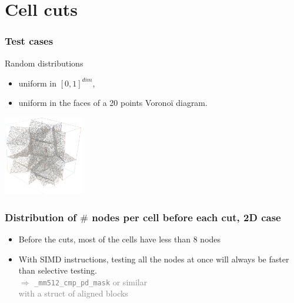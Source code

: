 \documentclass[aspectratio=169]{beamer}
\begin{document}
\section{Cell cuts}

\begin{frame}
    \frametitle{Test cases}

    Random distributions
    \begin{itemize}
        \item uniform in $[0,1]^{dim}$,
        \item uniform in the faces of a 20 points Voronoï diagram.
    \end{itemize}

    \vfill
    \begin{center}
        
        \kern 1cm
        \includegraphics[width=0.26\textwidth]{img/voro_distrib_3d.png}
    \end{center}
\end{frame}

\begin{frame}
    \frametitle{Distribution of $\#$ nodes per cell before each cut, 2D case}

    \begin{minipage}[c][0.6\textheight][c]{0.4\textwidth}
        
    \end{minipage}
    \textwidth
    \begin{minipage}{0.55\textwidth}
        \begin{itemize}
            \item Before the cuts, most of the cells have less than 8 nodes
            
            \bigskip
            \item With SIMD instructions, testing all the nodes at once will
                  always be faster than selective testing. 
                  \\ \hfill {\textcolor{gray}{$\Rightarrow$ \texttt{\_mm512\_cmp\_pd\_mask} or similar}}
                  \\ \hfill {\textcolor{gray}{with a struct of aligned blocks}}
              \end{itemize}
    \end{minipage}
\end{frame}
\end{document}
